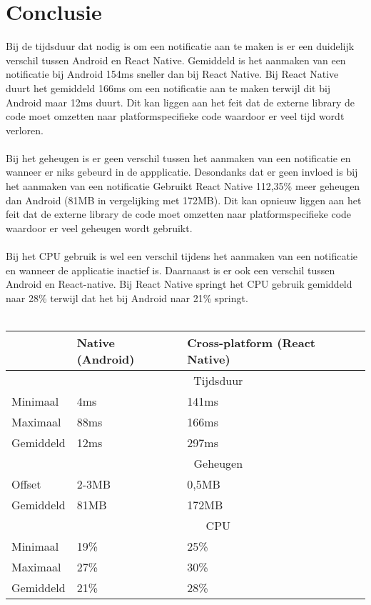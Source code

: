 \section{Conclusie}
Bij de tijdsduur dat nodig is om een notificatie aan te maken is er een duidelijk 
verschil tussen Android en React Native. Gemiddeld is het aanmaken van een notificatie bij Android
154ms sneller dan bij React Native. Bij React Native duurt het gemiddeld 166ms om een notificatie 
aan te maken terwijl dit bij Android maar 12ms duurt. Dit kan liggen aan het feit dat de externe 
library de code moet omzetten naar platformspecifieke code waardoor er veel tijd wordt verloren.
\\\\
Bij het geheugen is er geen verschil tussen het aanmaken van een notificatie en wanneer er 
niks gebeurd in de appplicatie. Desondanks dat er geen invloed is bij het aanmaken van een notificatie 
Gebruikt React Native 112,35\% meer geheugen dan Android (81MB in vergelijking met 172MB). 
Dit kan opnieuw liggen aan het feit dat de externe library
de code moet omzetten naar platformspecifieke code waardoor er veel geheugen wordt gebruikt.
\\\\
Bij het CPU gebruik is wel een verschil tijdens het aanmaken van een notificatie en wanneer de 
applicatie inactief is. Daarnaast is er ook een verschil tussen Android en React-native. Bij React Native 
springt het CPU gebruik gemiddeld naar 28\% terwijl dat het bij Android naar 21\% springt.
\\\\
\begin{tabular}{ |p{3cm}||p{4cm}|p{4cm}| }
    \hline
     & Native (Android) & Cross-platform (React Native) \\
    \hline
     & \multicolumn{2}{|c|}{Tijdsduur} \\
    \hline
    Minimaal & 4ms & 141ms \\
    Maximaal & 88ms & 166ms \\
    Gemiddeld & 12ms & 297ms \\
    \hline
     & \multicolumn{2}{|c|}{Geheugen} \\ 
    \hline
    Offset & 2-3MB & 0,5MB \\
    Gemiddeld & 81MB & 172MB \\
    \hline
     & \multicolumn{2}{|c|}{CPU} \\
    \hline
    Minimaal & 19\% & 25\% \\
    Maximaal & 27\% & 30\% \\
    Gemiddeld & 21\% & 28\% \\
    \hline
\end{tabular}

